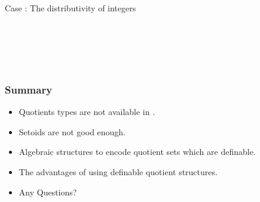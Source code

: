 \documentclass[11pt, mathserif,handout]{beamer}
\begin{document}
\begin{frame}[allowframebreaks,t]{Case : The distributivity of
    integers}
\begin{itemize}
\begin{code}
\>[43]\<%
\\
\>       \AgdaSymbol{=} \<%
\\
\>[0]\<[2]%
\>[2]\AgdaSymbol{(}  \AgdaSymbol{(}   \AgdaSymbol{)} \AgdaSymbol{(}   \AgdaSymbol{))}\<%
\\
\>[0]\<[2]%
\>[2]\AgdaSymbol{(} \AgdaSymbol{(}  \AgdaSymbol{)} \AgdaSymbol{(}  \AgdaSymbol{)} \AgdaSymbol{(}  \AgdaSymbol{)} \AgdaSymbol{(}  \AgdaSymbol{))}\<%
\\
\end{code}


\end{itemize}

\end{frame}

\begin{frame}
\frametitle{Summary}

\begin{itemize}

\item Quotients types are not available in \itt.

\item Setoids are not good enough.

\item Algebraic structures to encode quotient sets which are definable.

\item The advantages of using definable quotient structures.

\item \Large{Any Questions?}

\end{itemize}

\end{frame}
\end{document}
